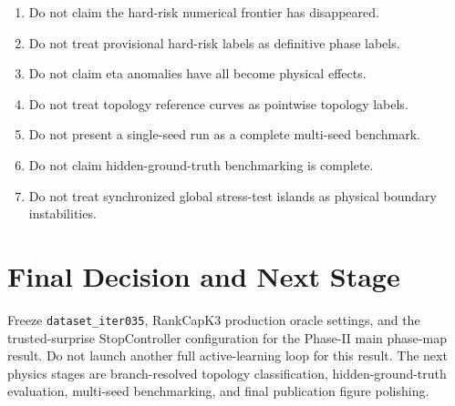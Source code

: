 \documentclass[11pt]{article}
\begin{document}
\begin{enumerate}\item Do not claim the hard-risk numerical frontier has disappeared.\item Do not treat provisional hard-risk labels as definitive phase labels.\item Do not claim eta anomalies have all become physical effects.\item Do not treat topology reference curves as pointwise topology labels.\item Do not present a single-seed run as a complete multi-seed benchmark.\item Do not claim hidden-ground-truth benchmarking is complete.\item Do not treat synchronized global stress-test islands as physical boundary instabilities.\end{enumerate}

\section{Final Decision and Next Stage}

Freeze \texttt{dataset\_iter035}, RankCapK3 production oracle settings, and the trusted-surprise StopController configuration for the Phase-II main phase-map result.  Do not launch another full active-learning loop for this result.  The next physics stages are branch-resolved topology classification, hidden-ground-truth evaluation, multi-seed benchmarking, and final publication figure polishing.
\end{document}
